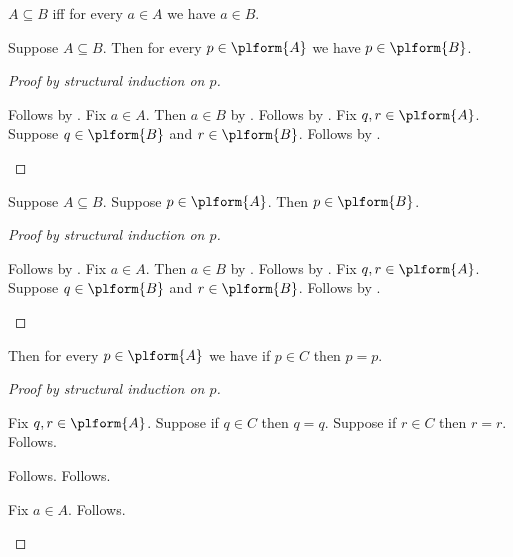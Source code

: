 

\begin{definition}\label{subseteq}
    $A\subseteq B$ iff for every $a\in A$ we have $a\in B$.
\end{definition}

\begin{proposition}\label{pl_formula_monotone}
    Suppose $A\subseteq B$.
    Then for every $p\in\plform{A}$ we have $p\in\plform{B}$.
\end{proposition}
\begin{proof}[Proof by structural induction on $p$]
    \begin{byCase}
            Follows by .
            Fix $a\in A$.
            Then $a\in B$ by .
            Follows by .
            Fix $q,r\in\plform{A}$.
            Suppose $q\in\plform{B}$ and $r\in\plform{B}$.
            Follows by .
    \end{byCase}
\end{proof}

\begin{proposition}\label{pl_formula_monotone_active}
    Suppose $A\subseteq B$.
    Suppose $p\in\plform{A}$.
    Then $p\in\plform{B}$.
\end{proposition}
\begin{proof}[Proof by structural induction on $p$]
    \begin{byCase}
            Follows by .
            Fix $a\in A$.
            Then $a\in B$ by .
            Follows by .
            Fix $q,r\in\plform{A}$.
            Suppose $q\in\plform{B}$ and $r\in\plform{B}$.
            Follows by .
    \end{byCase}
\end{proof}

\begin{proposition}\label{pl_formula_implicational_motive}
    Then for every $p\in\plform{A}$ we have
    if $p\in C$ then $p=p$.
\end{proposition}
\begin{proof}[Proof by structural induction on $p$]
    \begin{byCase}
            Fix $q,r\in\plform{A}$.
            Suppose if $q\in C$ then $q=q$.
            Suppose if $r\in C$ then $r=r$.
            Follows.
            \begin{byCase}
                 Follows.
                 Follows.
            \end{byCase}
            Fix $a\in A$.
            Follows.
    \end{byCase}
\end{proof}

